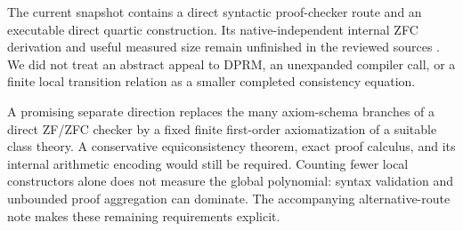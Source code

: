 \documentclass[11pt]{article}
\theoremstyle{remark}\newtheorem{remark}[theorem]{Remark}
\begin{document}
The current snapshot contains a direct syntactic proof-checker route and
an executable direct quartic construction. Its native-independent
internal ZFC derivation and useful measured size remain unfinished in
the reviewed sources \cite{alternatives}. We did not treat an abstract
appeal to DPRM, an unexpanded compiler call, or a finite local transition
relation as a smaller completed consistency equation.

A promising separate direction replaces the many axiom-schema branches
of a direct ZF/ZFC checker by a fixed finite first-order axiomatization
of a suitable class theory. A conservative equiconsistency theorem,
exact proof calculus, and its internal arithmetic encoding would still
be required. Counting fewer local constructors alone does not measure
the global polynomial: syntax validation and unbounded proof aggregation
can dominate. The accompanying alternative-route note makes these
remaining requirements explicit.
\end{document}
